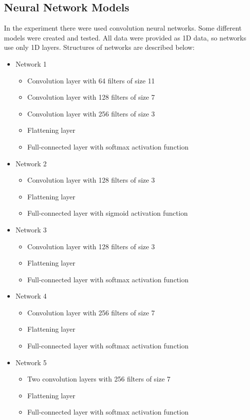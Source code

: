 \documentclass[10pt,journal,compsoc]{IEEEtran}
\begin{document}
\subsection{Neural Network Models}
In the experiment there were used convolution neural networks. Some different models were created and tested. All data were provided as 1D data, so networks use only 1D layers. Structures of networks are described below:
\begin{itemize}
\item{Network 1}
\begin{itemize}
\item{Convolution layer with 64 filters of size 11}
\item{Convolution layer with 128 filters of size 7}
\item{Convolution layer with 256 filters of size 3}
\item{Flattening layer}
\item{Full-connected layer with softmax activation function}
\end{itemize}
\item{Network 2}
\begin{itemize}
\item{Convolution layer with 128 filters of size 3}
\item{Flattening layer}
\item{Full-connected layer with sigmoid activation function}
\end{itemize}
\item{Network 3}
\begin{itemize}
\item{Convolution layer with 128 filters of size 3}
\item{Flattening layer}
\item{Full-connected layer with softmax activation function}
\end{itemize}
\item{Network 4}
\begin{itemize}
\item{Convolution layer with 256 filters of size 7}
\item{Flattening layer}
\item{Full-connected layer with softmax activation function}
\end{itemize}
\item{Network 5}
\begin{itemize}
\item{Two convolution layers with 256 filters of size 7}
\item{Flattening layer}
\item{Full-connected layer with softmax activation function}
\end{itemize}
\end{itemize}
\end{document}
